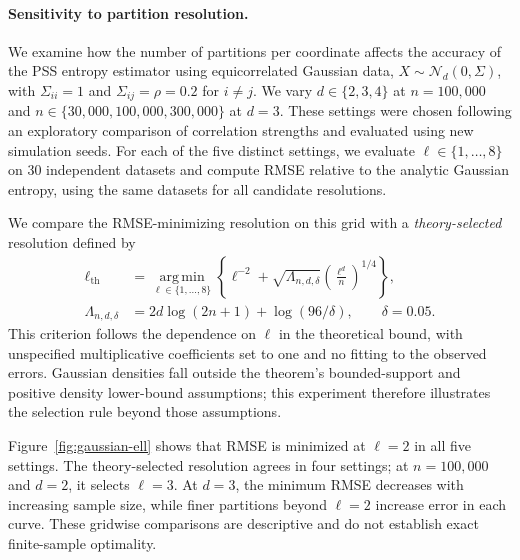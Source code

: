 
\paragraph{Sensitivity to partition resolution.}
We examine how the number of partitions per coordinate affects the accuracy
of the PSS entropy estimator using equicorrelated Gaussian data,
$X\sim\mathcal{N}_d(0,\Sigma)$, with $\Sigma_{ii}=1$ and
$\Sigma_{ij}=\rho=0.2$ for $i\ne j$.
We vary $d\in\{2,3,4\}$ at $n=100{,}000$ and
$n\in\{30{,}000,100{,}000,300{,}000\}$ at $d=3$.
These settings were chosen following an exploratory comparison of correlation
strengths and evaluated using new simulation seeds.
For each of the five distinct settings, we evaluate $\ell\in\{1,\ldots,8\}$
on 30 independent datasets and compute RMSE relative to the analytic Gaussian
entropy, using the same datasets for all candidate resolutions.

We compare the RMSE-minimizing resolution on this grid with a
\emph{theory-selected} resolution defined by
\begin{equation}
\begin{aligned}
\ell_{\mathrm{th}}
&=\underset{\ell\in\{1,\ldots,8\}}{\operatorname{arg\,min}}
\left\{\ell^{-2}+\sqrt{\Lambda_{n,d,\delta}}
\left(\frac{\ell^d}{n}\right)^{1/4}\right\},\\
\Lambda_{n,d,\delta}
&=2d\log(2n+1)+\log(96/\delta),\qquad\delta=0.05.
\end{aligned}
\label{eq:gaussian-theory-ell}
\end{equation}
This criterion follows the dependence on $\ell$ in the theoretical bound,
with unspecified multiplicative coefficients set to one and no fitting to
the observed errors.
Gaussian densities fall outside the theorem's bounded-support and positive
density lower-bound assumptions; this experiment therefore illustrates the
selection rule beyond those assumptions.

Figure~\ref{fig:gaussian-ell} shows that RMSE is minimized at $\ell=2$ in
all five settings. The theory-selected resolution agrees in four settings;
at $n=100{,}000$ and $d=2$, it selects $\ell=3$.
At $d=3$, the minimum RMSE decreases with increasing sample size, while finer
partitions beyond $\ell=2$ increase error in each curve.
These gridwise comparisons are descriptive and do not establish exact
finite-sample optimality.

